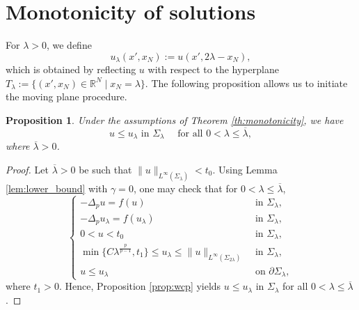\documentclass[reqno]{amsart}
\theoremstyle{plain}
\newtheorem{proposition}[theorem]{Proposition}
\theoremstyle{definition}
\theoremstyle{remark}
\begin{document}
	\section{Monotonicity of solutions}\label{sect3}
	
	For $\lambda>0$, we define
	\[
	u_\lambda (x', x_N) := u(x',2\lambda-x_N),
	\]
	which is obtained by reflecting $u$ with respect to the hyperplane $T_\lambda := \{(x',x_N)\in\mathbb{R}^N \mid x_N=\lambda\}$. The following proposition allows us to initiate the moving plane procedure.
	
	\begin{proposition}\label{prop:mn} Under the assumptions of Theorem \ref{th:monotonicity}, we have
		\[
		u\leq u_\lambda \text{ in } \Sigma_\lambda \quad\text{ for all } 0<\lambda\leq\overline\lambda,
		\]
		where $\overline\lambda>0$.
	\end{proposition}
	
	\begin{proof}
		Let $\overline\lambda>0$ be such that $\|u\|_{L^\infty(\Sigma_{\overline\lambda})} < t_0$.
		Using Lemma \ref{lem:lower_bound} with $\gamma=0$, one may check that for $0<\lambda\leq\overline\lambda$,
		\[
		\begin{cases}
			-\Delta_p u = f(u) &\text{ in } \Sigma_\lambda,\\
			-\Delta_p u_\lambda = f(u_\lambda) &\text{ in } \Sigma_\lambda,\\
			0<u<t_0 &\text{ in } \Sigma_\lambda,\\
			\min\{C \lambda^\frac{p}{p-1}, t_1\} \le u_\lambda\le\|u\|_{L^\infty(\Sigma_{2\lambda})} &\text{ in } \Sigma_\lambda,\\
			u \le u_\lambda &\text{ on } \partial\Sigma_\lambda,
		\end{cases}
		\]
		where $t_1>0$.
		Hence, Proposition \ref{prop:wcp} yields $u\leq u_\lambda$ in $\Sigma_\lambda$ for all $0<\lambda\leq\overline\lambda$.
	\end{proof}
	
\end{document}
